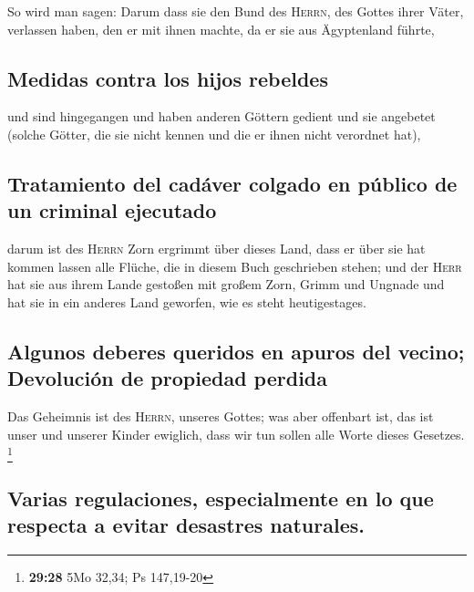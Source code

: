  So wird man sagen: Darum dass sie den Bund des
\textsc{Herrn}, des Gottes ihrer Väter, verlassen haben, den er mit
ihnen machte, da er sie aus Ägyptenland führte,

\hypertarget{medidas-contra-los-hijos-rebeldes}{%
\subsection{Medidas contra los hijos
rebeldes}\label{medidas-contra-los-hijos-rebeldes}}

 und sind hingegangen und haben anderen Göttern gedient
und sie angebetet (solche Götter, die sie nicht kennen und die er ihnen
nicht verordnet hat),

\hypertarget{tratamiento-del-caduxe1ver-colgado-en-puxfablico-de-un-criminal-ejecutado}{%
\subsection{Tratamiento del cadáver colgado en público de un criminal
ejecutado}\label{tratamiento-del-caduxe1ver-colgado-en-puxfablico-de-un-criminal-ejecutado}}

 darum ist des \textsc{Herrn} Zorn ergrimmt über dieses
Land, dass er über sie hat kommen lassen alle Flüche, die in diesem Buch
geschrieben stehen;  und der \textsc{Herr} hat sie aus
ihrem Lande gestoßen mit großem Zorn, Grimm und Ungnade und hat sie in
ein anderes Land geworfen, wie es steht heutigestages.

\hypertarget{algunos-deberes-queridos-en-apuros-del-vecino-devoluciuxf3n-de-propiedad-perdida}{%
\subsection{Algunos deberes queridos en apuros del vecino; Devolución de
propiedad
perdida}\label{algunos-deberes-queridos-en-apuros-del-vecino-devoluciuxf3n-de-propiedad-perdida}}

 Das Geheimnis ist des \textsc{Herrn}, unseres Gottes;
was aber offenbart ist, das ist unser und unserer Kinder ewiglich, dass
wir tun sollen alle Worte dieses Gesetzes. \footnote{\textbf{29:28} 5Mo
  32,34; Ps 147,19-20}

\hypertarget{varias-regulaciones-especialmente-en-lo-que-respecta-a-evitar-desastres-naturales.}{%
\subsection{Varias regulaciones, especialmente en lo que respecta a
evitar desastres
naturales.}\label{varias-regulaciones-especialmente-en-lo-que-respecta-a-evitar-desastres-naturales.}}

